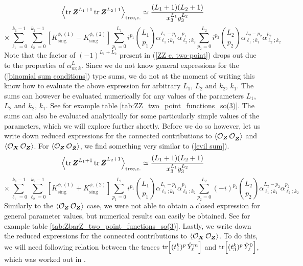 %
%
\begin{equation*}
\expval{\tr \boldsymbol{Z}^{L_1+1} \tr \boldsymbol{Z}^{L_2+1}}_{\mathrm{tree,c.}}
\simeq
\frac{(L_1+1) (L_2+1)}{x_3^{L_1} y_3^{L_2}}
\end{equation*}
%
%
\begin{equation}\label{evil sum}
\times
\sum_{\ell_1=0}^{k_1-1}
\sum_{\ell_2=0}^{k_2-1}
\left[
K^{\phi,(1)}_{\mathrm{sing}}
- K^{\phi,(2)}_{\mathrm{sing}}
\right]
\sum_{p_1=0}^{L_1} i^{p_1}
\binom{L_1}{p_1}
\alpha_{\ell_1;k_1}^{L_1-p_1} \alpha_{\ell_2;k_2}^{p_1}
\sum_{p_2=0}^{L_2} i^{p_2}
\binom{L_2}{p_2}
\alpha_{\ell_1;k_1}^{L_2-p_2} \alpha_{\ell_2;k_2}^{p_2}
\end{equation}
%
%
Note that the factor of $(-1)^{L_1 + L_2}$ present in (\ref{ZZ c. two-point}) drops out due to the properties of $\alpha_{m;k}^L$. Since we do not know general expressions for the (\ref{binomial sum conditions}) type sums, we do not at the moment of writing this know how to evaluate the above expression for arbitrary $L_1$, $L_2$ and $k_2$, $k_1$. The sums can however be evaluated numerically for any values of the parameters $L_1$, $L_2$ and $k_2$, $k_1$. See for example table \ref{tab:ZZ_two_point_functions_so(3)}. The sums can also be evaluated analytically for some particularly simple values of the parameters, which we will explore further shortly. Before we do so however, let us write down reduced expressions for the connected contributions to $\expval{\mathcal{O}_{\boldsymbol{Z}} \, \mathcal{O}_{\boldsymbol{\bar{Z}}}}$ and $\expval{\mathcal{O}_{\boldsymbol{X}} \, \mathcal{O}_{\boldsymbol{Z}}}$. For $\expval{\mathcal{O}_{\boldsymbol{Z}} \, \mathcal{O}_{\boldsymbol{\bar{Z}}}}$, we find something very similar to (\ref{evil sum}).
%
%
\begin{equation*}
\expval{\tr \boldsymbol{Z}^{L_1+1} \tr \boldsymbol{\bar{Z}}^{L_2+1}}_{\mathrm{tree,c.}}
\simeq
\frac{(L_1 + 1) (L_2 + 1)}{x_3^{L_1} y_3^{L_2}}
\end{equation*}
%
%
\begin{equation}
\times
\sum_{\ell_1=0}^{k_1-1}
\sum_{\ell_2=0}^{k_2-1}
\left[
K^{\phi,(1)}_{\mathrm{sing}}
+ K^{\phi,(2)}_{\mathrm{sing}}
\right]
\sum_{p_1=0}^{L_1} i^{p_1}
\binom{L_1}{p_1}
\alpha_{\ell_1;k_1}^{L_1-p_1} \alpha_{\ell_2;k_2}^{p_1}
\sum_{p_2=0}^{L_2} (-i)^{p_2}
\binom{L_2}{p_2}
\alpha_{\ell_1;k_1}^{L_2-p_2} \alpha_{\ell_2;k_2}^{p_2}
\end{equation}
%
%
Similarly to the $\expval{\mathcal{O}_{\boldsymbol{Z}} \, \mathcal{O}_{\boldsymbol{Z}}}$ case, we were not able to obtain a closed expression for general parameter values, but numerical results can easily be obtained. See for example table \ref{tab:ZbarZ_two_point_functions_so(3)}. Lastly, we write down the reduced expressions for the connected contributions to $\expval{\mathcal{O}_{\boldsymbol{X}} \, \mathcal{O}_{\boldsymbol{Z}}}$. To do this, we will need following relation between the traces $\tr[(t_1^k)^p \, \hat{Y}^m_\ell]$ and $\tr[(t_3^k)^p \, \hat{Y}^0_\ell]$, which was worked out in \cite{Two-point functions in D5-D3}.
